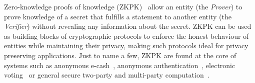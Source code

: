 %

%

Zero-knowledge proofs of knowledge (ZKPK)~\cite{Goldwasser:1985:KCI:22145.22178,Goldreich:1987:PNZ:36664.36675,springerlink:10.1007/BF02351717} allow an entity (the \emph{Prover}) to prove knowledge of a secret that fulfills a statement to another entity (the \emph{Verifier}) without revealing any information about the secret. ZKPK can be used as building blocks of cryptographic protocols to enforce the honest behaviour of entities while maintaining their privacy, making such protocols ideal for privacy preserving applications. Just to name a few, ZKPK are found at the core of systems such as anonymous e-cash~\cite{DBLP:conf/crypto/Chaum82,Camenisch05compacte-cash}, anonymous authentication~\cite{Brickell:2004:DAA:1030083.1030103,Nguyen05dynamick-times}, electronic voting~\cite{Groth:2005:NZA:2134532.2134564,Damgard03thetheory} or general secure two-party and multi-party computation~\cite{DBLP:conf/stoc/CanettiLOS02}.

